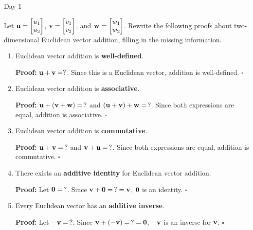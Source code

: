 
\begin{applicationActivities}{Day 1}

\begin{activity}{15}
Let \(\mathbf u=\begin{bmatrix} u_1 \\ u_2 \end{bmatrix}\),
\(\mathbf v=\begin{bmatrix} v_1 \\ v_2 \end{bmatrix}\), and
\(\mathbf w=\begin{bmatrix} w_1 \\ w_2 \end{bmatrix}\).
Rewrite the following proofs about two-dimensional Euclidean vector addition,
filling in the missing information.
\begin{enumerate}
  \item Euclidean vector addition is \textbf{well-defined}.

        \textbf{Proof:} \(\mathbf u+\mathbf v=?\). Since this is a Euclidean
        vector, addition is well-defined. \(\square\)
  \item Euclidean vector addition is \textbf{associative}.

        \textbf{Proof:} \(\mathbf u+(\mathbf v+\mathbf w)=\,?\) and
        \((\mathbf u+\mathbf v)+\mathbf w=\,?\). Since both expressions are equal,
        addition is associative. \(\square\)
  \item Euclidean vector addition is \textbf{commutative}.

        \textbf{Proof:} \(\mathbf u+\mathbf v=\,?\) and
        \(\mathbf v+\mathbf u=\,?\). Since both expressions are equal,
        addition is commutative. \(\square\)
  \item There exists an \textbf{additive identity} for Euclidean vector
        addition.

        \textbf{Proof:} Let \(\mathbf 0=\,?\). Since
        \(\mathbf v+\mathbf 0=\,?=\mathbf v\), \(\mathbf 0\) is an identity. \(\square\)
  \item Every Euclidean vector has an \textbf{additive inverse}.

        \textbf{Proof:} Let \(-\mathbf v=\,?\). Since
        \(\mathbf v+(-\mathbf v)=\,?=\mathbf 0\), \(-\mathbf v\) is an inverse
        for \(\mathbf v\). \(\square\)
\end{enumerate}
\end{activity}


\end{applicationActivities}
